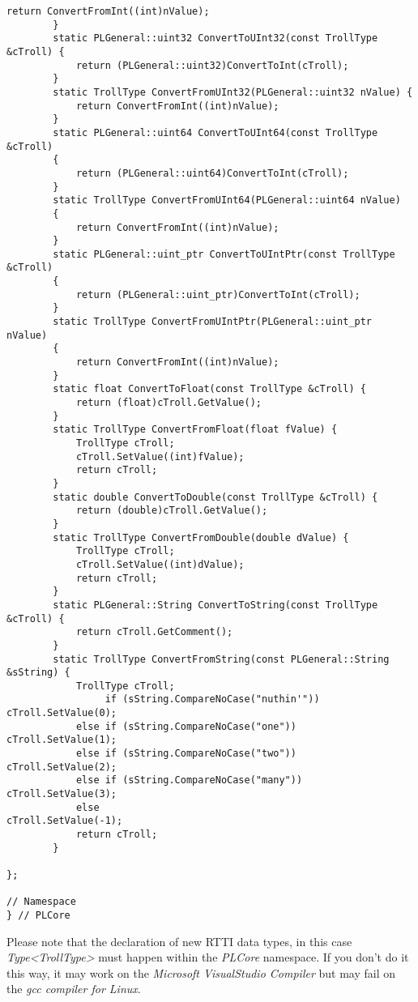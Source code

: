 \begin{lstlisting}[label=Code:UserDefinedRTTIDataTypeInline,caption={Inline of the user defined RTTI data type}]
			return ConvertFromInt((int)nValue);
		}
		static PLGeneral::uint32 ConvertToUInt32(const TrollType &cTroll) {
			return (PLGeneral::uint32)ConvertToInt(cTroll);
		}
		static TrollType ConvertFromUInt32(PLGeneral::uint32 nValue) {
			return ConvertFromInt((int)nValue);
		}
		static PLGeneral::uint64 ConvertToUInt64(const TrollType &cTroll)
		{
			return (PLGeneral::uint64)ConvertToInt(cTroll);
		}
		static TrollType ConvertFromUInt64(PLGeneral::uint64 nValue)
		{
			return ConvertFromInt((int)nValue);
		}
		static PLGeneral::uint_ptr ConvertToUIntPtr(const TrollType &cTroll)
		{
			return (PLGeneral::uint_ptr)ConvertToInt(cTroll);
		}
		static TrollType ConvertFromUIntPtr(PLGeneral::uint_ptr nValue)
		{
			return ConvertFromInt((int)nValue);
		}
		static float ConvertToFloat(const TrollType &cTroll) {
			return (float)cTroll.GetValue();
		}
		static TrollType ConvertFromFloat(float fValue) {
			TrollType cTroll;
			cTroll.SetValue((int)fValue);
			return cTroll;
		}
		static double ConvertToDouble(const TrollType &cTroll) {
			return (double)cTroll.GetValue();
		}
		static TrollType ConvertFromDouble(double dValue) {
			TrollType cTroll;
			cTroll.SetValue((int)dValue);
			return cTroll;
		}
		static PLGeneral::String ConvertToString(const TrollType &cTroll) {
			return cTroll.GetComment();
		}
		static TrollType ConvertFromString(const PLGeneral::String &sString) {
			TrollType cTroll;
				 if (sString.CompareNoCase("nuthin'"))	cTroll.SetValue(0);
			else if (sString.CompareNoCase("one"))		cTroll.SetValue(1);
			else if (sString.CompareNoCase("two"))		cTroll.SetValue(2);
			else if (sString.CompareNoCase("many"))		cTroll.SetValue(3);
			else										cTroll.SetValue(-1);
			return cTroll;
		}

};

// Namespace
} // PLCore
\end{lstlisting}
Please note that the declaration of new RTTI data types, in this case \emph{Type<TrollType>} must happen within the \emph{PLCore} namespace. If you don't do it this way, it may work on the \emph{Microsoft VisualStudio Compiler} but may fail on the \emph{gcc compiler for Linux}.


